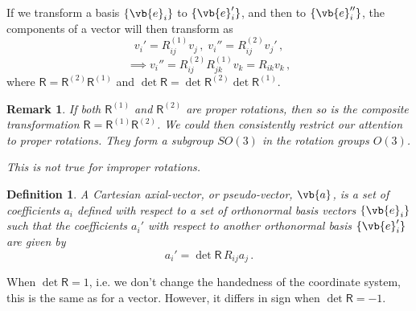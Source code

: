 \documentclass{article}
\theoremstyle{plain}\theoremheaderfont{\normalfont\itshape}\theorembodyfont{\rmfamily}\theoremseparator{.}\newtheorem*{rem}{Remark}\newtheorem*{ex}{Example}\newtheorem*{proof}{Proof}\newtheorem*{altp}{Alternative proof}
\theoremstyle{plain}\theoremheaderfont{\normalfont\bfseries}\theorembodyfont{\rmfamily}\theoremseparator{.}\newtheorem{thm}{Theorem}[section]\newtheorem{lem}[thm]{Lemma}\newtheorem{prop}[thm]{Proposition}\newtheorem*{cor}{Corollary}\newtheorem{defn}[thm]{Definition}\newtheorem{clm}[thm]{Claim}\newtheorem{clminproof}{Claim}
\theoremstyle{break}\theoremheaderfont{\normalfont\itshape}\theorembodyfont{\rmfamily}\theoremseparator{.\medskip}\newtheorem*{proofskip}{Proof}\newtheorem*{exs}{Examples}\newtheorem*{rems}{Remarks}
\theoremstyle{break}\theoremheaderfont{\normalfont\bfseries}\theorembodyfont{\rmfamily}\theoremseparator{.\medskip}\newtheorem{lemskip}[thm]{Lemma}\newtheorem{defnskip}[thm]{Definition}\newtheorem{propskip}[thm]{Proposition}\newtheorem{thmskip}[thm]{Theorem}
\numberwithin{equation}{section}
\begin{document}
	If we transform a basis \(\{\vb{e}_i\}\) to \(\{\vb{e}_i'\}\), and then to \(\{\vb{e}_i''\}\), the components of a vector will then transform as
	\[v_i'=R^{(1)}_{ij}v_j\,,\; v_i''=R^{(2)}_{ij}v_j'\,,\]
	\[\implies v_i''=R^{(2)}_{ij}R^{(1)}_{jk}v_k=R_{ik}v_k\,,\]
	where \(\mathsf{R}=\mathsf{R}^{(2)}\mathsf{R}^{(1)}\) and \(\det\mathsf{R}=\det\mathsf{R}^{(2)}\det\mathsf{R}^{(1)}\).
	\begin{rem}
		If both \(\mathsf{R}^{(1)}\) and \(\mathsf{R}^{(2)}\) are proper rotations, then so is the composite transformation \(\mathsf{R}=\mathsf{R}^{(1)}\mathsf{R}^{(2)}\). We could then consistently restrict our attention to proper rotations. They form a \textit{subgroup} \(SO(3)\) in the rotation groups \(O(3)\).
		
		This is not true for improper rotations.
	\end{rem}

	\begin{defn}
		A Cartesian \textit{axial-vector}, or \textit{pseudo-vector}, \(\vb{a}\), is a set of coefficients \(a_i\) defined with respect to a set of orthonormal basis vectors \(\{\vb{e}_i\}\) such that the coefficients \(a_i'\) with respect to another orthonormal basis \(\{\vb{e}_i'\}\) are given by
		\[a_i'=\det\mathsf{R}\,R_{ij}a_j\,.\]
	\end{defn}
	When \(\det\mathsf{R}=1\), i.e. we don't change the handedness of the coordinate system, this is the same as for a vector. However, it differs in sign when \(\det\mathsf{R}=-1\).
\end{document}
